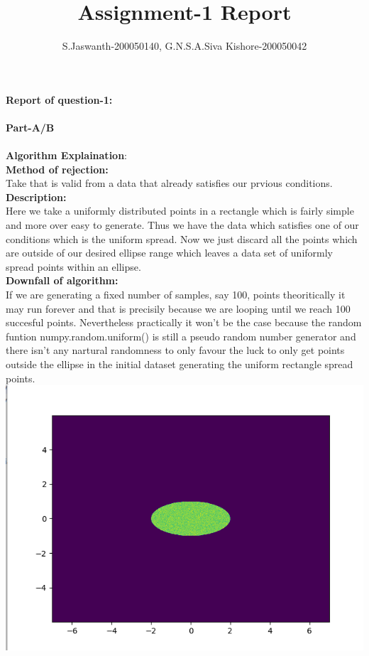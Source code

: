 \documentclass{article}
\title{Assignment-1 Report}
\author{S.Jaswanth-200050140, G.N.S.A.Siva Kishore-200050042}
\begin{document}
\maketitle
\newpage
$$ $$
\textbf{Report of question-1:}\\
    \\
    \textbf{Part-A/B}\\
    \\
    \textbf{Algorithm Explaination}:\\
    \textbf{Method of rejection:}\\
        Take that is valid from a data that already satisfies our prvious conditions.\\
    \textbf{Description:}\\
        Here we take a uniformly distributed points in a rectangle which is fairly simple
        and more over easy to generate. Thus we have the data which satisfies one of our 
        conditions which is the uniform spread. Now we just discard all the points which 
        are outside of our desired ellipse range which leaves a data set of uniformly spread
        points within an ellipse.\\
    \textbf{Downfall of algorithm:}\\
        If we are generating a fixed number of samples, say 100, points theoritically it may run forever and that is
        precisily because we are looping until we reach 100 succesful points. Nevertheless 
        practically it won't be the case because the random funtion numpy.random.uniform() is still
        a pseudo random number generator and there isn't any nartural randomness to only favour
        the luck to only get points outside the ellipse in the initial dataset generating the 
        uniform rectangle spread points.\\
    \includegraphics[scale=.6]{../results/q1/q1partA.png}\\
\end{document}
